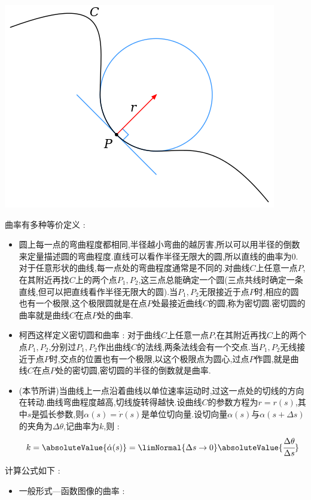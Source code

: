 {{{  \begin{center}
    \includegraphics[scale = 0.5]{resources/Osculating_circle.png}
  \end{center}

  曲率有多种等价定义 : \begin{itemize}
    \item 圆上每一点的弯曲程度都相同,半径越小弯曲的越厉害,所以可以用半径的倒数来定量描述圆的弯曲程度.直线可以看作半径无限大的圆,所以直线的曲率为$0$.对于任意形状的曲线,每一点处的弯曲程度通常是不同的.对曲线$C$上任意一点$P$,在其附近再找$C$上的两个点$P_1,P_2$,这三点总能确定一个圆(三点共线时确定一条直线,但可以把直线看作半径无限大的圆).当$P_1,P_2$无限接近于点$P$时,相应的圆也有一个极限,这个极限圆就是在点$P$处最接近曲线$C$的圆,称为密切圆.密切圆的曲率就是曲线$C$在点$P$处的曲率.
    \item 柯西这样定义密切圆和曲率 : 对于曲线$C$上任意一点$P$,在其附近再找$C$上的两个点$P_1,P_2$,分别过$P_1,P_2$作出曲线$C$的法线,两条法线会有一个交点.当$P_1,P_2$无线接近于点$P$时,交点的位置也有一个极限,以这个极限点为圆心,过点$P$作圆,就是曲线$C$在点$P$处的密切圆,密切圆的半径的倒数就是曲率.
    \item (本节所讲)当曲线上一点沿着曲线以单位速率运动时,过这一点处的切线的方向在转动.曲线弯曲程度越高,切线旋转得越快.设曲线$C$的参数方程为$r = r(s)$,其中$s$是弧长参数,则$\alpha(s) = \dot{r}(s)$是单位切向量.设切向量$\alpha(s)$与$\alpha(s + \Delta s)$的夹角为$\Delta \theta$,记曲率为$k$,则 : $$
            k = \absoluteValue{\dot{\alpha}(s)} = \limNormal{\Delta s \to 0}\absoluteValue{\cfrac{\Delta \theta}{\Delta s}}
          $$
  \end{itemize}

  计算公式如下 :
  \begin{itemize}
    \item {
          一般形式---函数图像的曲率 :

}
\end{itemize}}}}
